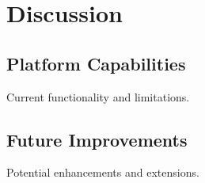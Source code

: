 \newpage
\section{Discussion}

\subsection{Platform Capabilities}
Current functionality and limitations.

\subsection{Future Improvements}
Potential enhancements and extensions. 